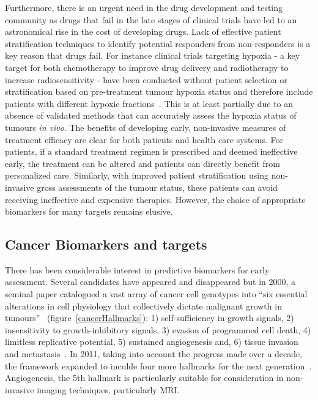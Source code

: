 Furthermore, there is an urgent need in the drug development and testing community as drugs that fail in the late stages of clinical trials have led to an astronomical rise in the cost of developing drugs.
Lack of effective patient stratification techniques to identify potential responders from non-responders is a key reason that drugs fail.
For instance clinical trials targeting hypoxia - a key target for both chemotherapy to improve drug delivery and radiotherapy to increase radiosensitivity - have been conducted without patient selection or stratification based on pre-treatment tumour hypoxia status and therefore include patients with different hypoxic fractions~\cite{Overgaard:2011ji}.
This is at least partially due to an absence of validated methods that can accurately assess the hypoxia status of tumours \emph{in vivo}.
The benefits of developing early, non-invasive measures of treatment efficacy are clear for both patients and health care systems.
For patients, if a standard treatment regimen is prescribed and deemed ineffective early, the treatment can be altered and patients can directly benefit from personalized care.
Similarly, with improved patient stratification using non-invasive gross assessments of the tumour status, these patients can avoid receiving ineffective and expensive therapies.
However, the choice of appropriate biomarkers for many targets remains elusive. 

\subsection{Cancer Biomarkers and targets} There has been considerable interest in predictive biomarkers for early assessment.
Several candidates have appeared and disappeared but in 2000, a seminal paper catalogued a vast array of cancer cell genotypes into ``six essential alterations in cell physiology that collectively dictate malignant growth in tumours''~\cite{Hanahan:2000wo} (figure~\ref{cancerHallmarks}): 1) self-sufficiency in growth signals, 2) insensitivity to growth-inhibitory signals, 3) evasion of programmed cell death, 4) limitless replicative potential, 5) sustained angiogenesis and, 6) tissue invasion and metastasis~\cite{Hanahan:2000wo}.
In 2011, taking into account the progress made over a decade, the framework expanded to inculde four more hallmarks for the next generation~\cite{Hanahan:2011gu}.
Angiogenesis, the 5th hallmark is particularly suitable for consideration in non-invasive imaging techniques, particularly MRI. 

